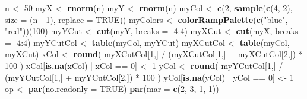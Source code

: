 \documentclass[twoside,symmetric]{book}
\newenvironment{Shaded}{}{}
\newcommand{\DataTypeTok}[1]{\underline{#1}}
\newcommand{\DecValTok}[1]{#1}
\newcommand{\KeywordTok}[1]{\textbf{#1}}
\newcommand{\NormalTok}[1]{#1}
\newcommand{\OperatorTok}[1]{#1}
\newcommand{\OtherTok}[1]{#1}
\newcommand{\StringTok}[1]{#1}
\begin{document}
\begin{Shaded}
\begin{Highlighting}[]
\NormalTok{n <-}\StringTok{ }\DecValTok{50}
\NormalTok{myX <-}\StringTok{ }\KeywordTok{rnorm}\NormalTok{(n)}
\NormalTok{myY <-}\StringTok{ }\KeywordTok{rnorm}\NormalTok{(n)}
\NormalTok{myCol <-}\StringTok{ }\KeywordTok{c}\NormalTok{(}\DecValTok{2}\NormalTok{, }\KeywordTok{sample}\NormalTok{(}\KeywordTok{c}\NormalTok{(}\DecValTok{4}\NormalTok{, }\DecValTok{2}\NormalTok{), }\DataTypeTok{size =}\NormalTok{ (n }\OperatorTok{-}\StringTok{ }\DecValTok{1}\NormalTok{), }\DataTypeTok{replace =} \OtherTok{TRUE}\NormalTok{))}
\NormalTok{myColors <-}\StringTok{ }\KeywordTok{colorRampPalette}\NormalTok{(}\KeywordTok{c}\NormalTok{(}\StringTok{"blue"}\NormalTok{, }\StringTok{"red"}\NormalTok{))(}\DecValTok{100}\NormalTok{)}
\NormalTok{myYCut <-}\StringTok{ }\KeywordTok{cut}\NormalTok{(myY, }\DataTypeTok{breaks =} \DecValTok{-4}\OperatorTok{:}\DecValTok{4}\NormalTok{)}
\NormalTok{myXCut <-}\StringTok{ }\KeywordTok{cut}\NormalTok{(myX, }\DataTypeTok{breaks =} \DecValTok{-4}\OperatorTok{:}\DecValTok{4}\NormalTok{)}
\NormalTok{myYCutCol <-}\StringTok{ }\KeywordTok{table}\NormalTok{(myCol, myYCut)}
\NormalTok{myXCutCol <-}\StringTok{ }\KeywordTok{table}\NormalTok{(myCol, myXCut)}
\NormalTok{xCol <-}\StringTok{ }\KeywordTok{round}\NormalTok{(}
\NormalTok{  myXCutCol[}\DecValTok{1}\NormalTok{,] }\OperatorTok{/}\StringTok{ }\NormalTok{(myXCutCol[}\DecValTok{1}\NormalTok{,] }\OperatorTok{+}\StringTok{ }\NormalTok{myXCutCol[}\DecValTok{2}\NormalTok{,]) }\OperatorTok{*}\StringTok{ }\DecValTok{100}
\NormalTok{)}
\NormalTok{xCol[}\KeywordTok{is.na}\NormalTok{(xCol) }\OperatorTok{|}\StringTok{ }\NormalTok{xCol }\OperatorTok{==}\StringTok{ }\DecValTok{0}\NormalTok{] <-}\StringTok{ }\DecValTok{1}
\NormalTok{yCol <-}\StringTok{ }\KeywordTok{round}\NormalTok{(}
\NormalTok{  myYCutCol[}\DecValTok{1}\NormalTok{,] }\OperatorTok{/}\StringTok{ }\NormalTok{(myYCutCol[}\DecValTok{1}\NormalTok{,] }\OperatorTok{+}\StringTok{ }\NormalTok{myYCutCol[}\DecValTok{2}\NormalTok{,]) }\OperatorTok{*}\StringTok{ }\DecValTok{100}
\NormalTok{)}
\NormalTok{yCol[}\KeywordTok{is.na}\NormalTok{(yCol) }\OperatorTok{|}\StringTok{ }\NormalTok{yCol }\OperatorTok{==}\StringTok{ }\DecValTok{0}\NormalTok{] <-}\StringTok{ }\DecValTok{1}
\NormalTok{op <-}\StringTok{ }\KeywordTok{par}\NormalTok{(}\DataTypeTok{no.readonly =} \OtherTok{TRUE}\NormalTok{)}
\KeywordTok{par}\NormalTok{(}\DataTypeTok{mar =} \KeywordTok{c}\NormalTok{(}\DecValTok{2}\NormalTok{, }\DecValTok{3}\NormalTok{, }\DecValTok{1}\NormalTok{, }\DecValTok{1}\NormalTok{))}

\end{Highlighting}
\end{Shaded}
\end{document}
